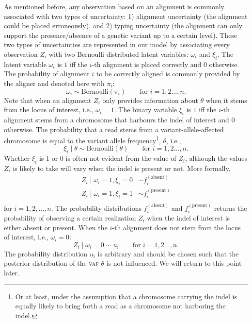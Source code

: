 \documentclass[12pt,a4paper]{article}
\numberwithin{equation}{section}
\begin{document}
As mentioned before, any observation based on an alignment is commonly associated with two types of uncertainty: 1) alignment uncertainty (the alignment could be placed erroneously), and 2) typing uncertainty (the alignment can only support the presence/absence of a genetic variant up to a certain level). These two types of uncertainties are represented in our model by associating every observation $Z_i$ with two Bernoulli distributed latent variables: $\omega_i$ and $\xi_i$. The latent variable $\omega_i$ is $1$ iff the $i$-th alignment is placed correctly and $0$ otherwise. The probability of alignment $i$ to be correctly aligned is commonly provided by the aligner and denoted here with $\pi_i$: 
\begin{equation}
	\omega_i \sim \text{Bernoulli}\left(\pi_i \right) \qquad \text{for }i=1,2\dots,n.
\end{equation}
Note that when an alignment $Z_i$ only provides information about $\theta$ when it stems from the locus of interest, i.e., $\omega_i = 1$. The binary variable $\xi_i$ is $1$ iff the $i$-th alignment stems from a chromosome that harbours the indel of interest and $0$ otherwise. The probability that a read stems from a variant-allele-affected chromosome is equal to the variant allele frequency\footnote{Or at least, under the assumption that a chromosome carrying the indel is equally likely to bring forth a read as a chromosome not harboring the indel.}, $\theta$, i.e.,
\begin{equation}
	\xi_i \mid \theta \sim \text{Bernoulli}\left(\theta  \right) \qquad \text{for }i=1,2\dots,n.
\end{equation}
Whether $\xi_i$ is $1$ or $0$ is often not evident from the value of $Z_i$, although the values $Z_i$ is likely to take will vary when the indel is present or not. More formally, 
\begin{equation}
	\begin{aligned}
	Z_i \mid \omega_i = 1, \xi_i = 0 & \sim f_i^{(\text{absent})} \\ 
	Z_i \mid \omega_i = 1, \xi_i = 1 & \sim f_i^{(\text{present})} \\ 
	\end{aligned}
\end{equation}
for $i = 1,2,\dots,n$. The probability distributions $f_i^{(\text{absent})}$ and $f_i^{(\text{present})}$ returns the probability of observing a certain realization $Z_i$ when the indel of interest is either absent or present. When the $i$-th alignment does not stem from the locus of interest, i.e., $\omega_i = 0$: 
\begin{equation}
	Z_i \mid \omega_i = 0 \sim u_i \qquad \text{for }i = 1,2\dots,n. 
\end{equation}
The probability distribution $u_i$ is arbitrary and should be chosen such that the posterior distribution of the \textsc{vaf} $\theta$ is not influenced. We will return to this point later. 
\end{document}
